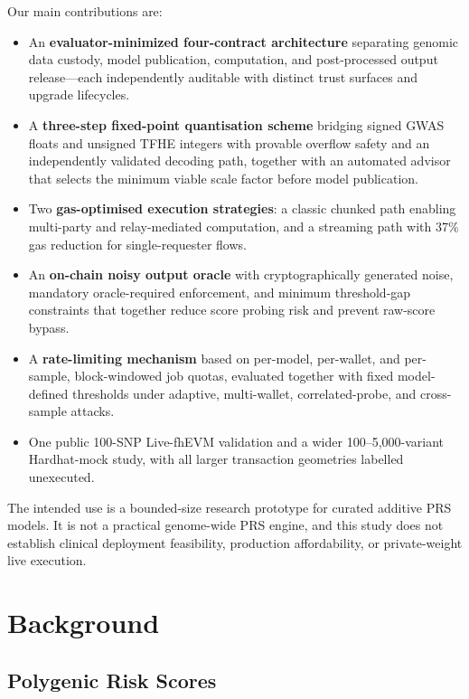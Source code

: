 \documentclass[10pt,twocolumn]{article}
\begin{document}
\smallskip\noindent Our main contributions are:
\begin{itemize}
  \item An \textbf{evaluator-minimized four-contract architecture} separating genomic data
        custody, model publication, computation, and post-processed output release---each independently
        auditable with distinct trust surfaces and upgrade lifecycles.
  \item A \textbf{three-step fixed-point quantisation scheme} bridging signed GWAS
        floats and unsigned TFHE integers with provable overflow safety and an
        independently validated decoding path, together with an automated advisor that
        selects the minimum viable scale factor before model publication.
  \item Two \textbf{gas-optimised execution strategies}: a classic chunked path
        enabling multi-party and relay-mediated computation, and a streaming path with
        37\% gas reduction for single-requester flows.
  \item An \textbf{on-chain noisy output oracle} with cryptographically generated noise,
        mandatory oracle-required enforcement, and minimum threshold-gap constraints
        that together reduce score probing risk and prevent raw-score bypass.
  \item A \textbf{rate-limiting mechanism} based on per-model, per-wallet, and per-sample,
        block-windowed job quotas, evaluated together with fixed model-defined thresholds
        under adaptive, multi-wallet, correlated-probe, and cross-sample attacks.
  \item One public 100-SNP Live-fhEVM validation and a wider 100--5,000-variant
        Hardhat-mock study, with all larger transaction geometries labelled unexecuted.
\end{itemize}

The intended use is a bounded-size research prototype for curated additive PRS models.
It is not a practical genome-wide PRS engine, and this study does not establish clinical
deployment feasibility, production affordability, or private-weight live execution.

\section{Background}
\label{sec:background}

\subsection{Polygenic Risk Scores}
\end{document}
